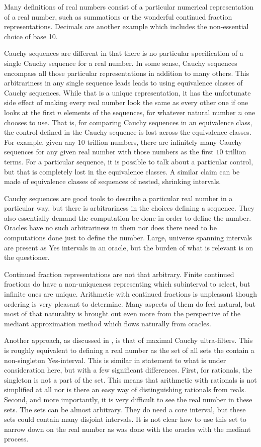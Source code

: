 \documentclass[12pt]{article}
\theoremstyle{remark}
\begin{document}
Many definitions of real numbers consist of a particular numerical representation of a real number, such as summations or the wonderful continued fraction representations. Decimals are another example which includes the non-essential choice of base 10. 

Cauchy sequences are different in that there is no particular specification of a single Cauchy sequence for a real number. In some sense, Cauchy sequences encompass all those particular representations in addition to many others. This arbitrariness in any single sequence leads leads to using equivalence classes of Cauchy sequences. While that is a unique representation, it has the unfortunate side effect of making every real number look the same as every other one if one looks at the first $n$ elements of the sequences, for whatever natural number $n$ one chooses to use. That is, for comparing Cauchy sequences in an equivalence class, the control defined in the Cauchy sequence is lost across the equivalence classes. For example, given any $10$ trillion numbers, there are infinitely many Cauchy sequences for any given real number with those numbers as the first $10$ trillion terms. For a particular sequence, it is possible to talk about a particular control, but that is completely lost in the equivalence classes. A similar claim can be made of equivalence classes of sequences of nested, shrinking intervals. 

Cauchy sequences are good tools to describe a particular real number in a particular way, but there is arbitrariness in the choices defining a sequence. They also essentially demand the computation be done in order to define the number. Oracles have no such arbitrariness in them nor does there need to be computations done just to define the number. Large, universe spanning intervals are present as Yes intervals in an oracle, but the burden of what is relevant is on the questioner. 

Continued fraction representations are not that arbitrary. Finite continued fractions do have a non-uniqueness representing which subinterval to select, but infinite ones are unique. Arithmetic with continued fractions is unpleasant though ordering is very pleasant to determine. Many aspects of them do feel natural, but most of that naturality is brought out even more from the perspective of the mediant approximation method which flows naturally from oracles. 

Another approach, as discussed in \cite{ittay-2015}, is that of maximal Cauchy ultra-filters. This is roughly equivalent to defining a real number as the set of all sets the contain a non-singleton Yes-interval. This is similar in statement to what is under consideration here, but with a few significant differences. First, for rationals, the singleton is not a part of the set. This means that arithmetic with rationals is not simplified at all nor is there an easy way of distinguishing rationals from reals. Second, and more importantly, it is very difficult to see the real number in these sets. The sets can be almost arbitrary. They do need a core interval, but these sets could contain many disjoint intervals. It is not clear how to use this set to narrow down on the real number as was done with the oracles with the mediant process.  
\end{document}

